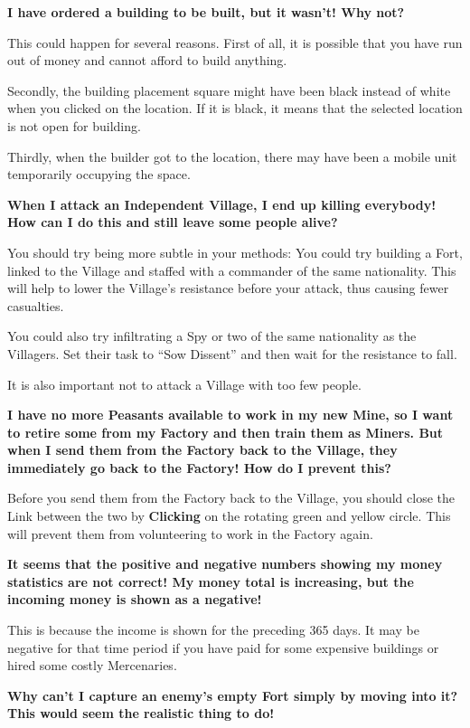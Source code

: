 {\large \textbf{\textsf{I have ordered a building to be built, but it wasn’t! Why not?}}}

This could happen for several reasons. First of all, it is possible that you have run out of money and cannot afford to build anything.

Secondly, the building placement square might have been black instead of white when you clicked on the location. If it is black, it means that the selected location is not open for building.

Thirdly, when the builder got to the location, there may have been a mobile unit temporarily occupying the space.

{\large \textbf{\textsf{When I attack an Independent Village, I end up killing everybody! How can I do this and still leave some people alive?}}}

You should try being more subtle in your methods: You could try building a Fort, linked to the Village and staffed with a commander of the same nationality. This will help to lower the Village’s resistance before your attack, thus causing fewer casualties.

You could also try infiltrating a Spy or two of the same nationality as the Villagers. Set their task to “Sow Dissent” and then wait for the resistance to fall.

It is also important not to attack a Village with too few people.

{\large \textbf{\textsf{I have no more Peasants available to work in my new Mine, so I want to retire some from my Factory and then train them as Miners. But when I send them from the Factory back to the Village, they immediately go back to the Factory! How do I prevent this?}}}

Before you send them from the Factory back to the Village, you should close the Link between the two by \textbf{Clicking} on the rotating green and yellow circle. This will prevent them from volunteering to work in the Factory again.

{\large \textbf{\textsf{It seems that the positive and negative numbers showing my money statistics are not correct! My money total is increasing, but the incoming money is shown as a negative!}}}

This is because the income is shown for the preceding 365 days. It may be negative for that time period if you have paid for some expensive buildings or hired some costly Mercenaries.

{\large \textbf{\textsf{Why can’t I capture an enemy’s empty Fort simply by moving into it? This would seem the realistic thing to do!}}}

